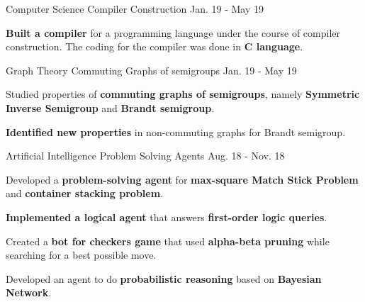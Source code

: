 

\begin{cventries}

  \cventry
    {Computer Science} %
    {Compiler Construction} %
    {} %
    {Jan. 19 - May 19} %
    {
      \begin{cvitems}
        \item{\textbf{Built a compiler} for a programming language under the course of
         compiler construction. The coding for the compiler was done in \textbf{C language}.}
      \end{cvitems}
    }

  \cventry
    {Graph Theory} %
    {Commuting Graphs of semigroups} %
    {} %
    {Jan. 19 - May 19} %
    {
      \begin{cvitems}
        \item{Studied properties of \textbf{commuting graphs of semigroups},
         namely \textbf{Symmetric Inverse Semigroup} and \textbf{Brandt semigroup}.}
        \item{\textbf{Identified new properties} in non-commuting graphs for Brandt semigroup.}
      \end{cvitems}
    }

  \cventry
    {Artificial Intelligence} %
    {Problem Solving Agents} %
    {} %
    {Aug. 18 - Nov. 18} %
    {
      \begin{cvitems}
        \item{Developed a \textbf{problem-solving agent} for \textbf{max-square Match Stick Problem}
         and \textbf{container stacking problem}.}
        \item{\textbf{Implemented a logical agent} that answers \textbf{first-order logic queries}.}
        \item{Created a \textbf{bot for checkers game} that used \textbf{alpha-beta pruning}
         while searching for a best possible move.}
        \item{Developed an agent to do \textbf{probabilistic reasoning} based on \textbf{Bayesian Network}.}
      \end{cvitems}
    }


\end{cventries}
